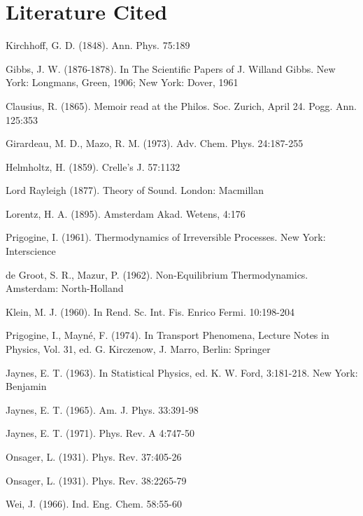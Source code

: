 \documentclass{article}
\begin{document}
\section*{Literature Cited}

\begin{thebibliography}{99}  %

 Kirchhoff, G. D. (1848). Ann. Phys. 75:189

 Gibbs, J. W. (1876-1878). In The Scientific Papers of J. Willand Gibbs. New York: Longmans, Green, 1906; New York: Dover, 1961

 Clausius, R. (1865). Memoir read at the Philos. Soc. Zurich, April 24. Pogg. Ann. 125:353

 Girardeau, M. D., Mazo, R. M. (1973). Adv. Chem. Phys. 24:187-255

 Helmholtz, H. (1859). Crelle's J. 57:1132

 Lord Rayleigh (1877). Theory of Sound. London: Macmillan

 Lorentz, H. A. (1895). Amsterdam Akad. Wetens, 4:176

 Prigogine, I. (1961). Thermodynamics of Irreversible Processes. New York: Interscience

 de Groot, S. R., Mazur, P. (1962). Non-Equilibrium Thermodynamics. Amsterdam: North-Holland

 Klein, M. J. (1960). In Rend. Sc. Int. Fis. Enrico Fermi. 10:198-204

 Prigogine, I., Mayné, F. (1974). In Transport Phenomena, Lecture Notes in Physics, Vol. 31, ed. G. Kirczenow, J. Marro, Berlin: Springer

 Jaynes, E. T. (1963). In Statistical Physics, ed. K. W. Ford, 3:181-218. New York: Benjamin

 Jaynes, E. T. (1965). Am. J. Phys. 33:391-98

 Jaynes, E. T. (1971). Phys. Rev. A 4:747-50

 Onsager, L. (1931). Phys. Rev. 37:405-26

 Onsager, L. (1931). Phys. Rev. 38:2265-79

 Wei, J. (1966). Ind. Eng. Chem. 58:55-60


\end{thebibliography}
\end{document}
